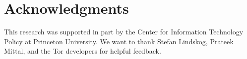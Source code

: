 \section*{Acknowledgments}
This research was supported in part by the Center for Information Technology
Policy at Princeton University.  We want to thank Stefan Lindskog, Prateek
Mittal, and the Tor developers for helpful feedback.
